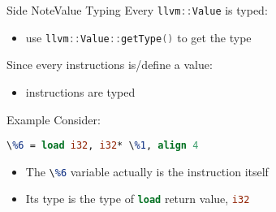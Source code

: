 \documentclass[10pt,mathserif]{beamer}
\newcommand{\cppinline}[1]{\lstinline[language=C++]!#1!}
\newcommand{\llvminline}[1]{\lstinline[language=LLVM]!#1!}
\begin{document}
\begin{frame}{Side Note}{Value Typing}
Every \cppinline{llvm::Value} is typed:

\begin{itemize}
\item use \cppinline{llvm::Value::getType()} to get the type
\end{itemize}

\vfill
Since every instructions is/define a value:

\begin{itemize}
\item instructions are typed
\end{itemize}

\vfill
\begin{block}{Example}
Consider:

\centering
\llvminline{\%6 = load i32, i32* \%1, align 4}

\flushleft
\begin{itemize}
\item The \llvminline{\%6} variable actually is the instruction itself
\item Its type is the type of \llvminline{load} return value, \llvminline{i32}
\end{itemize}
\end{block}
\end{frame}
\end{document}
